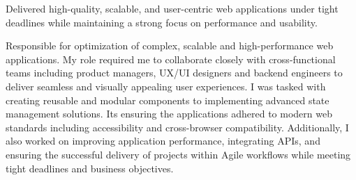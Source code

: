 \begin{cventries}
{\begin{cvitems}
        \item {Delivered high-quality, scalable, and user-centric web applications under tight deadlines while maintaining a strong focus on performance and usability.}
      \end{cvitems}
    }
    {
      Responsible for optimization of complex, scalable and high-performance web applications. My role required me to collaborate closely with cross-functional teams including product managers, UX/UI designers and backend engineers to deliver seamless and visually appealing user experiences. I was tasked with creating reusable and modular components to implementing advanced state management solutions. Its ensuring the applications adhered to modern web standards including accessibility and cross-browser compatibility. Additionally, I also worked on improving application performance, integrating APIs, and ensuring the successful delivery of projects within Agile workflows while meeting tight deadlines and business objectives.
    }
    

\end{cventries}
